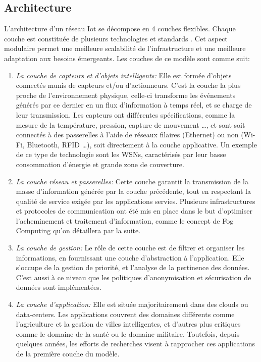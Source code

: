 \subsection{Architecture}
L'architecture d'un réseau Iot se décompose en 4 couches flexibles. Chaque couche est constituée de plusieurs technologies et standards \cite{patel2016}. Cet aspect modulaire permet une meilleure scalabilité de l'infrastructure et une meilleure adaptation aux besoins émergeants. Les couches de ce modèle sont comme suit:
\begin{enumerate}
  \item \emph{La couche de capteurs et d'objets intelligents:} Elle est formée d'objets connectés munis de capteurs et/ou d'actionneurs. C'est la couche la plus proche de l'environnement physique, celle-ci transforme les événements générés par ce dernier en un flux d'information à temps réel, et se charge de leur transmission. Les capteurs ont différentes spécifications, comme la mesure de la température, pression, capture de mouvement …, et sont soit connectés à des passerelles à l'aide de réseaux filaires (Ethernet) ou non (Wi-Fi, Bluetooth, RFID …), soit directement à la couche applicative. Un exemple de ce type de technologie sont les WSNs, caractérisés par leur basse consommation d'énergie et grande zone de couverture.
  \item \emph{La couche réseau et passerelles:} Cette couche garantit la transmission de la masse d'information générée par la couche précédente, tout en respectant la qualité de service exigée par les applications servies. Plusieurs infrastructures et protocoles de communication ont été mis en place dans le but d'optimiser l'acheminement et traitement d'information, comme le concept de Fog Computing qu'on détaillera par la suite.
  \item \emph{La couche de gestion:} Le rôle de cette couche est de filtrer et organiser les informations, en fournissant une couche d'abstraction à l'application. Elle s'occupe de la gestion de priorité, et l'analyse de la pertinence des données. C'est aussi à ce niveau que les politiques d'anonymisation et sécurisation de données sont implémentées.
  \item \emph{La couche d'application:} Elle est située majoritairement dans des clouds ou data-centers. Les applications couvrent des domaines différents comme l'agriculture et la gestion de villes intelligentes, et d'autres plus critiques comme le domaine de la santé ou le domaine militaire. Toutefois, depuis quelques années, les efforts de recherches visent à rapprocher ces applications de la première couche du modèle.
\end{enumerate}

